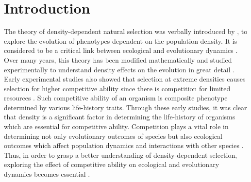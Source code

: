 \chapter{Introduction}
The theory of density-dependent natural selection was verbally introduced by \citet{macarthurGENERALIZEDTHEOREMSNATURAL1962}, \citet*{macarthurTheoryIslandBiogeography1967} to explore the evolution of phenotypes dependent on the population density. It is considered to be a critical link between ecological and evolutionary dynamics \citep{muellerTheoreticalEmpiricalExamination1997}. Over many years, this theory has been modified mathematically and studied experimentally to understand density effects on the evolution in great detail \citep{andersonDensityRegulatedSelectionGenotypic1983,asmussenDensityDependentSelectionIncorporating1983,clarkeDensityDependentSelection1972,muellerTheoreticalEmpiricalExamination1997,roughgardenDensityDependentNaturalSelection1971,santosDensityDependentNaturalSelection1997}. Early experimental studies also showed that selection at extreme densities causes selection for higher competitive ability since there is competition for limited resources \citep{joshiKselectionAselectionEffectiveness2001}. Such competitive ability of an organism is composite phenotype determined by various life-history traits. Through these early studies, it was clear that density is a significant factor in determining the life-history of organisms which are essential for competitive ability. Competition plays a vital role in determining not only evolutionary outcomes of species but also ecological outcomes which affect population dynamics and interactions with other species \citep{caseIllustratedGuideTheoretical2000a,deyAdaptationLarvalCrowding2012}. Thus, in order to grasp a better understanding of density-dependent selection, exploring the effect of competitive ability on ecological and evolutionary dynamics becomes essential \citep{prasadWhatHaveTwo2003}.  \\\\
